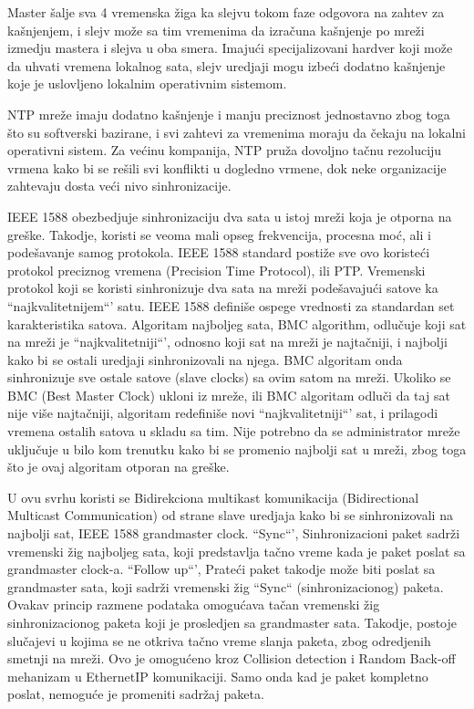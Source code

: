 \documentclass[a4paper,12pt, master]{etf}
\begin{document}
	Master \v{s}alje sva 4 vremenska \v{z}iga ka slejvu tokom faze odgovora na zahtev za ka\v{s}njenjem, 
	i slejv mo\v{z}e sa tim vremenima da izra\v{c}una ka\v{s}njenje po mre\v{z}i izmedju mastera i slejva u 
	oba smera. Imaju\'{c}i specijalizovani hardver koji mo\v{z}e da uhvati vremena lokalnog sata, 
	slejv uredjaji mogu izbe\'{c}i dodatno ka\v{s}njenje koje je uslovljeno lokalnim operativnim 
	sistemom.

	NTP mre\v{z}e imaju dodatno ka\v{s}njenje i manju preciznost jednostavno zbog toga \v{s}to su 
	softverski bazirane, i svi zahtevi za vremenima moraju da \v{c}ekaju na lokalni operativni 
	sistem. Za ve\'{c}inu kompanija, NTP pru\v{z}a dovoljno ta\v{c}nu rezoluciju vrmena kako bi se re\v{s}ili 
	svi konflikti u dogledno vrmene, dok neke organizacije zahtevaju dosta ve\'{c}i nivo 
	sinhronizacije.

	IEEE 1588 obezbedjuje sinhronizaciju dva sata u istoj mre\v{z}i koja je otporna na gre\v{s}ke. 
	Takodje, koristi se veoma mali opseg frekvencija, procesna mo\'{c}, ali i pode\v{s}avanje samog 
	protokola. IEEE 1588 standard posti\v{z}e sve ovo koriste\'{c}i protokol preciznog vremena 
	(Precision Time Protocol), ili PTP. Vremenski protokol koji se koristi sinhronizuje dva sata na 
	mre\v{z}i pode\v{s}avaju\'{c}i satove ka ``najkvalitetnijem``' satu. IEEE 1588 
	defini\v{s}e ospege vrednosti za standardan set karakteristika satova. Algoritam najboljeg 
	sata, BMC algorithm, odlu\v{c}uje koji sat na mre\v{z}i je ``najkvalitetniji``', odnosno koji sat na 
	mre\v{z}i je najta\v{c}niji, i najbolji kako bi se ostali uredjaji sinhronizovali na njega. BMC 
	algoritam onda sinhronizuje sve ostale satove (slave clocks) sa ovim satom na mre\v{z}i. 
	Ukoliko se BMC (Best Master Clock) ukloni iz mre\v{z}e, ili BMC algoritam odlu\v{c}i da taj sat 
	nije vi\v{s}e najta\v{c}niji, algoritam redefini\v{s}e novi ``najkvalitetniji``' sat, i prilagodi 
	vremena ostalih satova u skladu sa tim. Nije potrebno da se administrator mre\v{z}e uklju\v{c}uje 
	u bilo kom trenutku kako bi se promenio najbolji sat u mre\v{z}i, zbog toga \v{s}to je ovaj 
	algoritam otporan na gre\v{s}ke.
	
	U ovu svrhu koristi se Bidirekciona multikast komunikacija (Bidirectional Multicast Communication)
	 od strane slave uredjaja kako bi se sinhronizovali na najbolji sat, IEEE 1588 grandmaster clock. 
	``Sync``', Sinhronizacioni paket sadr\v{z}i vremenski \v{z}ig najboljeg sata, koji predstavlja 
	ta\v{c}no vreme kada je paket poslat sa grandmaster clock-a. ``Follow up``', Prate\'{c}i paket 
	takodje mo\v{z}e biti poslat sa grandmaster sata, koji sadr\v{z}i vremenski \v{z}ig ``Sync`` 
	(sinhronizacionog) paketa. Ovakav princip razmene podataka omogu\'{c}ava ta\v{c}an vremenski 
	\v{z}ig sinhronizacionog paketa koji je prosledjen sa grandmaster sata. Takodje, postoje 
	slu\v{c}ajevi u kojima se ne otkriva ta\v{c}no vreme slanja paketa, zbog odredjenih smetnji na 
	mre\v{z}i. Ovo je omogu\'{c}eno kroz Collision detection i Random Back-off 
	mehanizam u Ethernet\/IP komunikaciji. Samo onda kad je paket kompletno poslat, nemogu\'{c}e 
	je promeniti sadr\v{z}aj paketa. 
\end{document}
